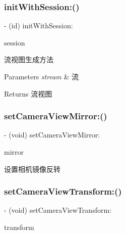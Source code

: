 \subsubsection{\texorpdfstring{init\+With\+Session\+:()}{initWithSession:()}}
{\footnotesize\ttfamily -\/ (id) init\+With\+Session\+: \begin{DoxyParamCaption}\item[{(A\+V\+Capture\+Session $\ast$)}]{session }\end{DoxyParamCaption}}

流视图生成方法


\begin{DoxyParams}{Parameters}
{\em stream} & 流 \\
\hline
\end{DoxyParams}
\begin{DoxyReturn}{Returns}
流视图 
\end{DoxyReturn}
\mbox{\label{interface_c_c_stream_view_acc6bbb88b8529b7e2621ca78bcdee643}} 
\subsubsection{\texorpdfstring{set\+Camera\+View\+Mirror\+:()}{setCameraViewMirror:()}}
{\footnotesize\ttfamily -\/ (void) set\+Camera\+View\+Mirror\+: \begin{DoxyParamCaption}\item[{(B\+O\+OL)}]{mirror }\end{DoxyParamCaption}}

设置相机镜像反转 \mbox{\label{interface_c_c_stream_view_a459e2ceb67d1f1c40690d64b6ea609bb}} 
\subsubsection{\texorpdfstring{set\+Camera\+View\+Transform\+:()}{setCameraViewTransform:()}}
{\footnotesize\ttfamily -\/ (void) set\+Camera\+View\+Transform\+: \begin{DoxyParamCaption}\item[{(C\+G\+Affine\+Transform)}]{transform }\end{DoxyParamCaption}}


